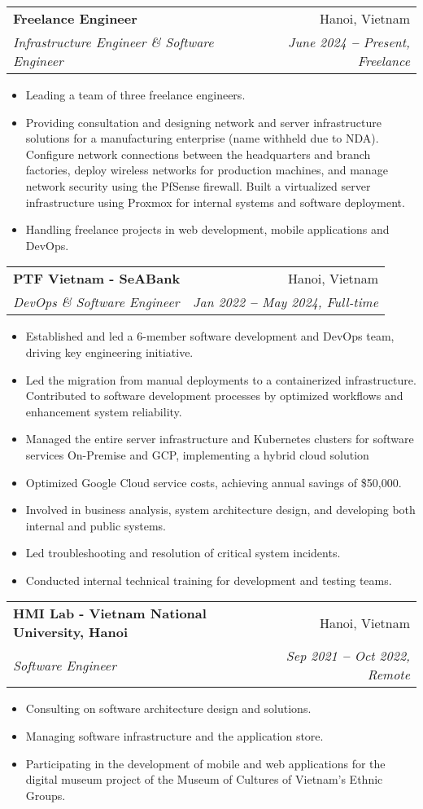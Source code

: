 \documentclass[letterpaper,11pt]{article}
\makeatletter
\newcommand{\resumeItem}[1]{
  \item\small{
    {#1 \vspace{-2pt}}
  }
}
\newcommand{\resumeSubheading}[4]{
  \vspace{-2pt}\item
    \begin{tabular*}{0.97\textwidth}[t]{l@{\extracolsep{\fill}}r}
      \textbf{#1} & #2 \\
      \textit{\small#3} & \textit{\small #4} \\
    \end{tabular*}\vspace{-7pt}
}
\newcommand{\resumeItemListStart}{\begin{itemize}}
\newcommand{\resumeItemListEnd}{\end{itemize}\vspace{-5pt}}
\makeatother
\begin{document}
    \resumeSubheading
      {Freelance Engineer}{Hanoi, Vietnam}
      {Infrastructure Engineer \& Software Engineer}{June 2024 \textbf{--} Present, Freelance}
        \resumeItemListStart
            \resumeItem{Leading a team of three freelance engineers.}
            \resumeItem{Providing consultation and designing network and server infrastructure solutions for a manufacturing enterprise (name withheld due to NDA). Configure network connections between the headquarters and branch factories, deploy wireless networks for production machines, and manage network security using the PfSense firewall. Built a virtualized server infrastructure using Proxmox for internal systems and software deployment.}
            \resumeItem{Handling freelance projects in web development, mobile applications and DevOps.}
        \resumeItemListEnd

    \resumeSubheading
      {PTF Vietnam - SeABank}{Hanoi, Vietnam}
      {DevOps \& Software Engineer}{Jan 2022 \textbf{--} May 2024, Full-time}
        \resumeItemListStart
            \resumeItem{Established and led a 6-member software development and DevOps team, driving key engineering initiative.}
            \resumeItem{Led the migration from manual deployments to a containerized infrastructure. Contributed to software development processes by optimized workflows and enhancement system reliability.}
            \resumeItem{Managed the entire server infrastructure and Kubernetes clusters for software services On-Premise and GCP, implementing a hybrid cloud solution}
            \resumeItem{Optimized Google Cloud service costs, achieving annual savings of \$50,000.}
            \resumeItem{Involved in business analysis, system architecture design, and developing both internal and public systems.}
            \resumeItem{Led troubleshooting and resolution of critical system incidents.}
            \resumeItem{Conducted internal technical training for development and testing teams.}
        \resumeItemListEnd

    \resumeSubheading
      {HMI Lab - Vietnam National University, Hanoi}{Hanoi, Vietnam}
      {Software Engineer}{Sep 2021 \textbf{--} Oct 2022, Remote}
        \resumeItemListStart
            \resumeItem{Consulting on software architecture design and solutions.}
            \resumeItem{Managing software infrastructure and the application store.}
            \resumeItem{Participating in the development of mobile and web applications for the digital museum project of the Museum of Cultures of Vietnam's Ethnic Groups.}
        \resumeItemListEnd
\end{document}
